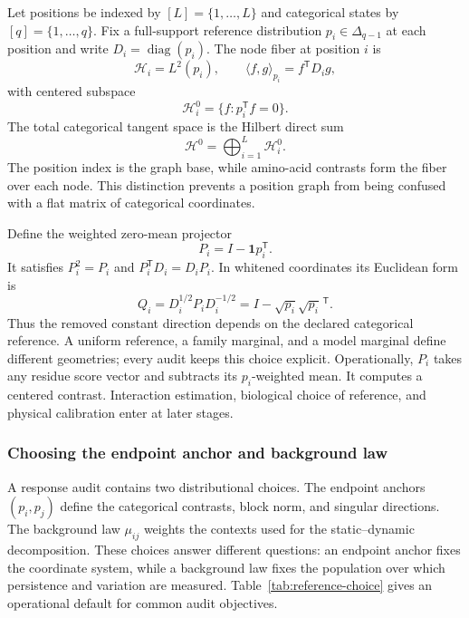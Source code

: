 \documentclass[10pt]{article}
\newcommand{\diag}{\operatorname{diag}}
\theoremstyle{definition}
\theoremstyle{remark}
\newcommand{\BookSubsection}[1]{\subsubsection{#1}}
\begin{document}
Let positions be indexed by $[L]=\{1,\ldots,L\}$ and categorical states by
$[q]=\{1,\ldots,q\}$.  Fix a full-support reference distribution
$p_i\in\Delta_{q-1}$ at each position and write $D_i=\diag(p_i)$.  The node fiber at position $i$
is
\begin{equation}
\mathcal H_i=L^2(p_i),
\qquad
\langle f,g\rangle_{p_i}=f^{\mathsf T}D_i g,
\end{equation}
with centered subspace
\begin{equation}
\mathcal H_i^0=\{f:p_i^{\mathsf T}f=0\}.
\label{eq:centered-fiber}
\end{equation}
The total categorical tangent space is the Hilbert direct sum
\begin{equation}
\mathcal H^0=\bigoplus_{i=1}^L\mathcal H_i^0.
\label{eq:direct-sum}
\end{equation}
The position index is the graph base, while amino-acid contrasts form the fiber over each node.
This distinction prevents a position graph from being confused with a flat matrix of categorical
coordinates.

Define the weighted zero-mean projector
\begin{equation}
P_i=I-\mathbf 1p_i^{\mathsf T}.
\label{eq:projector}
\end{equation}
It satisfies $P_i^2=P_i$ and $P_i^{\mathsf T}D_i=D_iP_i$.  In whitened coordinates its Euclidean
form is
\begin{equation}
Q_i=D_i^{1/2}P_iD_i^{-1/2}
=I-\sqrt{p_i}\sqrt{p_i}^{\,\mathsf T}.
\label{eq:whitened-projector}
\end{equation}
Thus the removed constant direction depends on the declared categorical reference.  A uniform
reference, a family marginal, and a model marginal define different geometries; every audit keeps
this choice explicit.  Operationally, $P_i$ takes any residue score vector and subtracts its
$p_i$-weighted mean.  It computes a centered contrast.  Interaction estimation, biological choice
of reference, and physical calibration enter at later stages.

\BookSubsection{Choosing the endpoint anchor and background law}

A response audit contains two distributional choices.  The endpoint anchors $(p_i,p_j)$ define the
categorical contrasts, block norm, and singular directions.  The background law $\mu_{ij}$ weights
the contexts used for the static--dynamic decomposition.  These choices answer different
questions: an endpoint anchor fixes the coordinate system, while a background law fixes the
population over which persistence and variation are measured.  Table~\ref{tab:reference-choice}
gives an operational default for common audit objectives.
\end{document}
